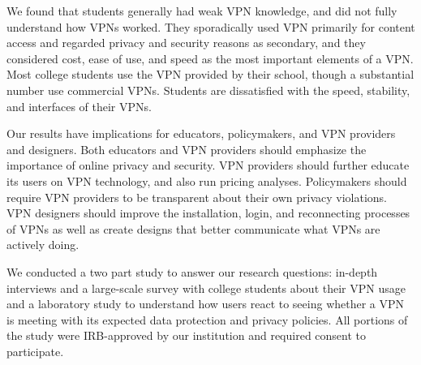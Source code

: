 We found that students generally had weak VPN knowledge, and did not fully
understand how VPNs worked. They sporadically used VPN primarily for content
access and regarded privacy and security reasons as secondary, and they
considered cost, ease of use, and speed as the most important elements of a
VPN. Most college students use the VPN provided by their school, though a
substantial number use commercial VPNs. Students are dissatisfied with the
speed, stability, and interfaces of their VPNs.

Our results have implications for educators, policymakers, and VPN providers
and designers. Both educators and VPN providers should emphasize the
importance of online privacy and security. VPN providers should further
educate its users on VPN technology, and also run pricing analyses.
Policymakers should require VPN providers to be transparent about their own
privacy violations. VPN designers should improve the installation, login, and
reconnecting processes of VPNs as well as create designs that better
communicate what VPNs are actively doing.

We conducted a two part study to answer our research questions:  in-depth
interviews and  a large-scale survey with college students about their VPN
usage and a laboratory study to understand how users react to seeing whether a
VPN is meeting with its expected data protection and privacy policies. All
portions of the study were IRB-approved by our institution and required
consent to participate.
